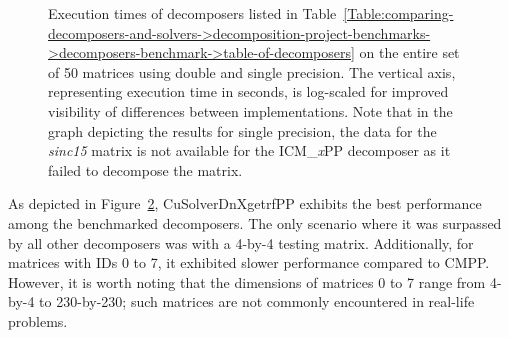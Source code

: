 \begin{figure}[ht!]
\begin{subfigure}{\textwidth}
		\label{Figure:comparing-decomposers-and-solvers->decomposition-project-benchmarks->decomposers-benchmark->comparison-of-execution-time-on-all-matrices->single-precision}
	\end{subfigure}
	\caption{Execution times of decomposers listed in Table~\ref{Table:comparing-decomposers-and-solvers->decomposition-project-benchmarks->decomposers-benchmark->table-of-decomposers} on the entire set of 50 matrices using double and single precision. The vertical axis, representing execution time in seconds, is log-scaled for improved visibility of differences between implementations. Note that in the graph depicting the results for single precision, the data for the \textit{sinc15} matrix is not available for the ICM\_\textit{x}PP decomposer as it failed to decompose the matrix.}
	\label{Figure:comparing-decomposers-and-solvers->decomposition-project-benchmarks->decomposers-benchmark->comparison-of-execution-time-on-all-matrices->double-and-single-precision}
\end{figure}

As depicted in Figure~\ref{Figure:comparing-decomposers-and-solvers->decomposition-project-benchmarks->decomposers-benchmark->comparison-of-execution-time-on-all-matrices->double-and-single-precision}, CuSolverDnXgetrfPP exhibits the best performance among the benchmarked decomposers. The only scenario where it was surpassed by all other decomposers was with a 4-by-4 testing matrix. Additionally, for matrices with IDs 0 to 7, it exhibited slower performance compared to CMPP. However, it is worth noting that the dimensions of matrices 0 to 7 range from 4-by-4 to 230-by-230; such matrices are not commonly encountered in real-life problems.

